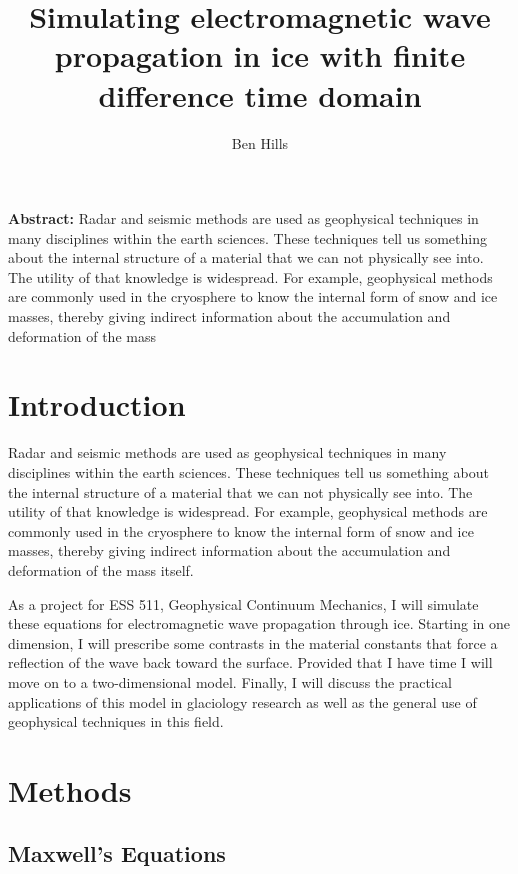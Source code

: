 \documentclass[a4paper]{article}
\begin{document}
\title{Simulating electromagnetic wave propagation in ice with finite difference time domain}
\author{Ben Hills}
\maketitle

\justify
\textbf{Abstract:} Radar and seismic methods are used as geophysical techniques in many disciplines within the earth sciences. These techniques tell us something about the internal structure of a material that we can not physically see into. The utility of that knowledge is widespread. For example, geophysical methods are commonly used in the cryosphere to know the internal form of snow and ice masses, thereby giving indirect information about the accumulation and deformation of the mass

\raggedright
\section{Introduction}
Radar and seismic methods are used as geophysical techniques in many disciplines within the earth sciences. These techniques tell us something about the internal structure of a material that we can not physically see into. The utility of that knowledge is widespread. For example, geophysical methods are commonly used in the cryosphere to know the internal form of snow and ice masses, thereby giving indirect information about the accumulation and deformation of the mass
itself. 

As a project for ESS 511, Geophysical Continuum Mechanics, I will simulate these equations for electromagnetic wave propagation through ice. Starting in one dimension, I will prescribe some contrasts in the material constants that force a reflection of the wave back toward the surface. Provided that I have time I will move on to a two-dimensional model. Finally, I will discuss the practical applications of this model in glaciology research \cite{Christianson2016} as well as the general use of geophysical techniques in this field.

\section{Methods}

\subsection{Maxwell's Equations}
\end{document}
